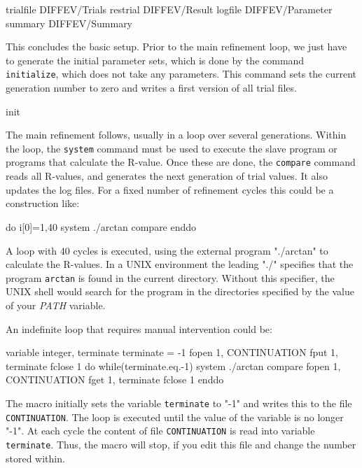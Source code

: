 \begin{MacVerbatim}
   trialfile  DIFFEV/Trials
   restrial   DIFFEV/Result
   logfile    DIFFEV/Parameter
   summary    DIFFEV/Summary
\end{MacVerbatim}

This concludes the basic setup. Prior to the main refinement loop, we
just have to generate the initial parameter sets, which is done by
the command {\tt initialize}, which does not take any parameters.
This command sets the current generation number to zero and writes
a first version of all trial files.

\begin{MacVerbatim}
   init
\end{MacVerbatim}

The main refinement follows, usually in a loop over several generations.
Within the loop, the {\tt system} command must be used to execute the 
slave program or programs that calculate the R-value. Once these are 
done, the {\tt compare} command reads all R-values, and generates the
next generation of trial values. It also updates the log files. For a 
fixed number of refinement cycles this could be a construction like:

\begin{MacVerbatim}
   do i[0]=1,40
     system ./arctan
     compare
   enddo
\end{MacVerbatim}

A loop with 40 cycles is executed, using the external program "./arctan"
to calculate the R-values. In a UNIX environment the leading "./" 
specifies that the program {\tt arctan} is found in the current 
directory. Without this specifier, the UNIX shell would search for 
the program in the directories specified by the value of your 
{\em PATH} variable. 

An indefinite loop that requires manual intervention could be:

\begin{MacVerbatim}
   variable integer, terminate
   terminate = -1
   fopen 1, CONTINUATION
   fput  1, terminate
   fclose 1
   do while(terminate.eq.-1)
      system ./arctan
     compare
     fopen 1, CONTINUATION
     fget  1, terminate
     fclose 1
  enddo
\end{MacVerbatim}

The macro initially sets the variable {\tt terminate} to "-1" and 
writes this to the file {\tt CONTINUATION}. The loop is executed
until the value of the variable is no longer "-1". At each cycle
the content of file {\tt CONTINUATION} is read into variable 
{\tt terminate}. Thus, the macro will stop, if you edit this file
and change the number stored within.

